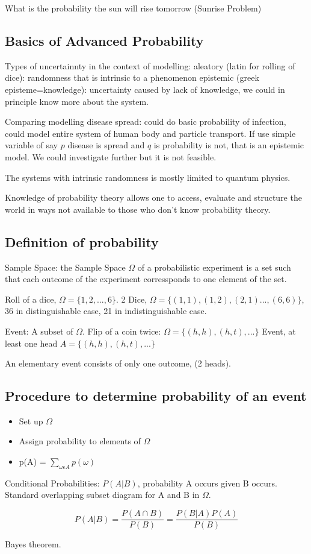 \documentclass[]{article}
\begin{document}
	What is the probability the sun will rise tomorrow (Sunrise Problem)
	
	\subsection{Basics of Advanced Probability}
	
	Types of uncertainnty in the context of modelling:
		aleatory (latin for rolling of dice): randomness that is intrinsic to a phenomenon
		epistemic (greek episteme=knowledge): uncertainty caused by lack of knowledge, we could in principle know more about the system.
		
	Comparing modelling disease spread: could do basic probability of infection, could model entire system of human body and particle transport. If use simple variable of say $p$ disease is spread and $q$ is probability is not, that is an epistemic model. We could investigate further but it is not feasible.
	
	The systems with intrinsic randomness is mostly limited to quantum physics.
	
	Knowledge of probability theory allows one to access, evaluate and structure the world in ways not available to those who don't know probability theory.
	
	\subsection{Definition of probability}
	
	Sample Space: the Sample Space $\Omega$ of a probabilistic experiment is a set such that each outcome of the experiment corressponds to one element of the set.
	
		Roll of a dice, $\Omega = \{1, 2, ..., 6\}$.
		2 Dice, $\Omega = \{(1, 1), (1, 2), (2, 1)..., (6, 6) \}$, 36 in distinguishable case, 21 in indistinguishable case.
		
	Event: A subset of $\Omega$.
		Flip of a coin twice: $\Omega = \{(h, h), (h, t), ...\}$
		Event, at least one head $A = \{(h, h), (h, t), ...\}$
		
	An elementary event consists of only one outcome, (2 heads).
	
	\subsection{Procedure to determine probability of an event}	
		\begin{itemize}
			\item Set up $\Omega$
			\item Assign probability to elements of $\Omega$
			\item p(A) = $\sum_{\omega\epsilon A} p(\omega)$
		\end{itemize}
		
	Conditional Probabilities: $P(A|B)$, probability A occurs given B occurs. Standard overlapping subset diagram for A and B  in $\Omega$.
	
	\begin{equation}
		P(A|B) = \frac{P(A\cap B)}{P(B)} = \frac{P(B|A)P(A)}{P(B)}
	\end{equation}
	
	Bayes theorem.
	
	

		
\end{document}
